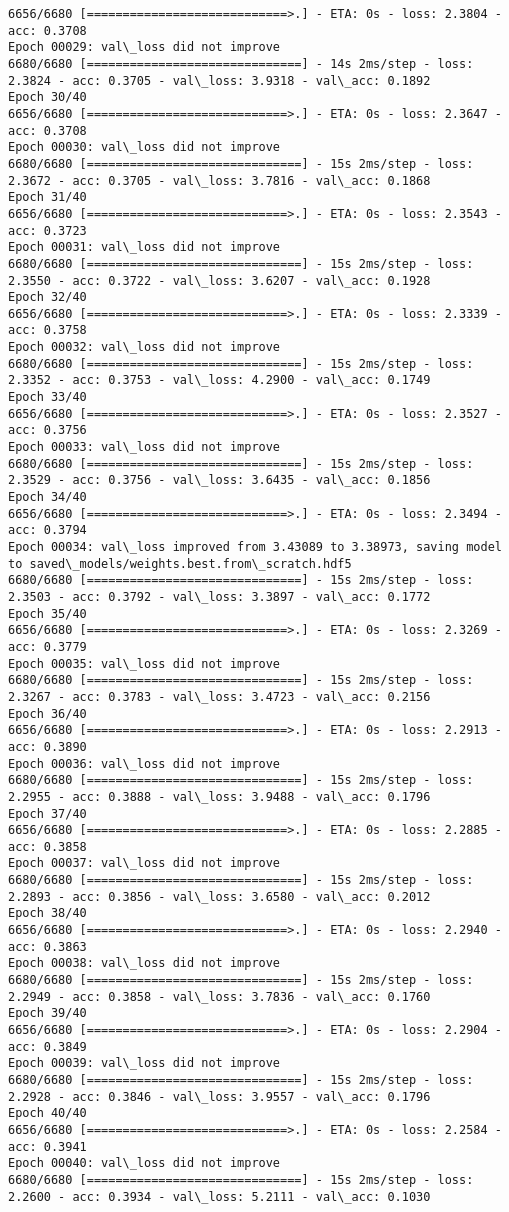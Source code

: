 \documentclass[11pt]{article}
\begin{document}
\begin{Verbatim}[commandchars=\\\{\}]
6656/6680 [============================>.] - ETA: 0s - loss: 2.3804 - acc: 0.3708
Epoch 00029: val\_loss did not improve
6680/6680 [==============================] - 14s 2ms/step - loss: 2.3824 - acc: 0.3705 - val\_loss: 3.9318 - val\_acc: 0.1892
Epoch 30/40
6656/6680 [============================>.] - ETA: 0s - loss: 2.3647 - acc: 0.3708
Epoch 00030: val\_loss did not improve
6680/6680 [==============================] - 15s 2ms/step - loss: 2.3672 - acc: 0.3705 - val\_loss: 3.7816 - val\_acc: 0.1868
Epoch 31/40
6656/6680 [============================>.] - ETA: 0s - loss: 2.3543 - acc: 0.3723
Epoch 00031: val\_loss did not improve
6680/6680 [==============================] - 15s 2ms/step - loss: 2.3550 - acc: 0.3722 - val\_loss: 3.6207 - val\_acc: 0.1928
Epoch 32/40
6656/6680 [============================>.] - ETA: 0s - loss: 2.3339 - acc: 0.3758
Epoch 00032: val\_loss did not improve
6680/6680 [==============================] - 15s 2ms/step - loss: 2.3352 - acc: 0.3753 - val\_loss: 4.2900 - val\_acc: 0.1749
Epoch 33/40
6656/6680 [============================>.] - ETA: 0s - loss: 2.3527 - acc: 0.3756
Epoch 00033: val\_loss did not improve
6680/6680 [==============================] - 15s 2ms/step - loss: 2.3529 - acc: 0.3756 - val\_loss: 3.6435 - val\_acc: 0.1856
Epoch 34/40
6656/6680 [============================>.] - ETA: 0s - loss: 2.3494 - acc: 0.3794
Epoch 00034: val\_loss improved from 3.43089 to 3.38973, saving model to saved\_models/weights.best.from\_scratch.hdf5
6680/6680 [==============================] - 15s 2ms/step - loss: 2.3503 - acc: 0.3792 - val\_loss: 3.3897 - val\_acc: 0.1772
Epoch 35/40
6656/6680 [============================>.] - ETA: 0s - loss: 2.3269 - acc: 0.3779
Epoch 00035: val\_loss did not improve
6680/6680 [==============================] - 15s 2ms/step - loss: 2.3267 - acc: 0.3783 - val\_loss: 3.4723 - val\_acc: 0.2156
Epoch 36/40
6656/6680 [============================>.] - ETA: 0s - loss: 2.2913 - acc: 0.3890
Epoch 00036: val\_loss did not improve
6680/6680 [==============================] - 15s 2ms/step - loss: 2.2955 - acc: 0.3888 - val\_loss: 3.9488 - val\_acc: 0.1796
Epoch 37/40
6656/6680 [============================>.] - ETA: 0s - loss: 2.2885 - acc: 0.3858
Epoch 00037: val\_loss did not improve
6680/6680 [==============================] - 15s 2ms/step - loss: 2.2893 - acc: 0.3856 - val\_loss: 3.6580 - val\_acc: 0.2012
Epoch 38/40
6656/6680 [============================>.] - ETA: 0s - loss: 2.2940 - acc: 0.3863
Epoch 00038: val\_loss did not improve
6680/6680 [==============================] - 15s 2ms/step - loss: 2.2949 - acc: 0.3858 - val\_loss: 3.7836 - val\_acc: 0.1760
Epoch 39/40
6656/6680 [============================>.] - ETA: 0s - loss: 2.2904 - acc: 0.3849
Epoch 00039: val\_loss did not improve
6680/6680 [==============================] - 15s 2ms/step - loss: 2.2928 - acc: 0.3846 - val\_loss: 3.9557 - val\_acc: 0.1796
Epoch 40/40
6656/6680 [============================>.] - ETA: 0s - loss: 2.2584 - acc: 0.3941
Epoch 00040: val\_loss did not improve
6680/6680 [==============================] - 15s 2ms/step - loss: 2.2600 - acc: 0.3934 - val\_loss: 5.2111 - val\_acc: 0.1030

    \end{Verbatim}
\end{document}
